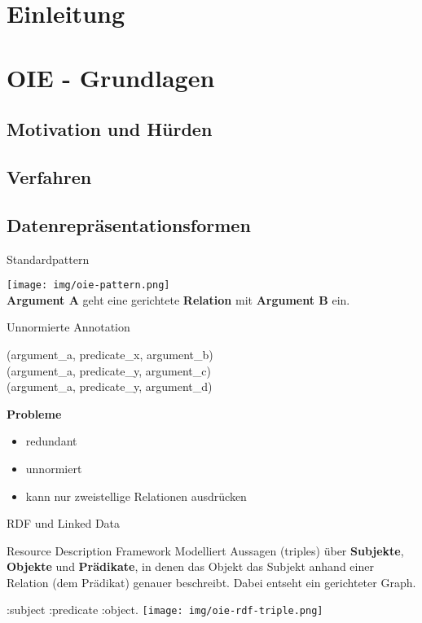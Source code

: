 \documentclass[11pt]{beamer}
\begin{document}
\section{Einleitung}
\section{OIE - Grundlagen}
	\subsection{Motivation und Hürden}
	\subsection{Verfahren}
	\subsection{Datenrepräsentationsformen}
		\begin{frame}{Standardpattern}
			\begin{center}
				\texttt{[image: img/oie-pattern.png]}\\
				\vspace{15pt}
				\textbf{Argument A} geht eine gerichtete \textbf{Relation} mit \textbf{Argument B} ein.
			\end{center}
		\end{frame}
		
		\begin{frame}{Unnormierte Annotation}
			\begin{center}
				(argument\_a, predicate\_x, argument\_b)\\
				(argument\_a, predicate\_y, argument\_c)\\
				(argument\_a, predicate\_y, argument\_d)
			\end{center}
			\vspace{15pt}
			\textbf{Probleme}\\
			\begin{itemize}
				\item redundant
				\item unnormiert
				\item kann nur zweistellige Relationen ausdrücken
			\end{itemize}
		\end{frame}
		
		\begin{frame}{RDF und Linked Data}
			\begin{block}{Resource Description Framework}
				Modelliert Aussagen (triples) über \textbf{Subjekte}, \textbf{Objekte} und \textbf{Prädikate}, in denen das Objekt das Subjekt anhand einer Relation (dem Prädikat) genauer beschreibt. Dabei entseht ein gerichteter Graph.
			\end{block}
			\vspace{10pt}
			\begin{center}
				:subject :predicate :object.
				\vspace{10pt}
				\texttt{[image: img/oie-rdf-triple.png]}
			\end{center}
		\end{frame}
		
\end{document}
